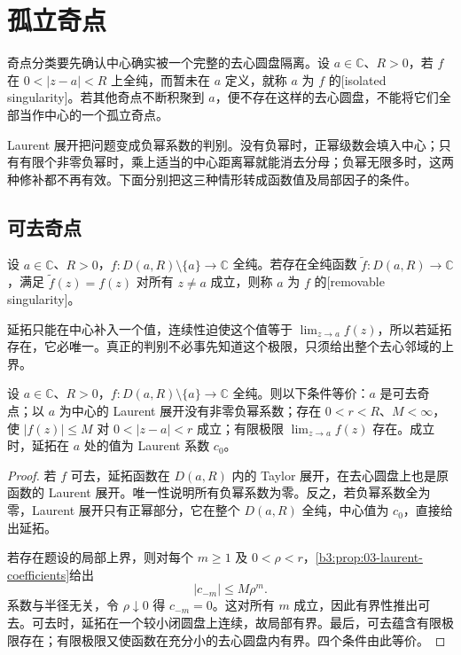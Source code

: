 \section{孤立奇点}
\label{b3:sec:0302}

奇点分类要先确认中心确实被一个完整的去心圆盘隔离。设 \(a\in\mathbb C\)、\(R>0\)，若 \(f\) 在 \(0<|z-a|<R\) 上全纯，而暂未在 \(a\) 定义，就称 \(a\) 为 \(f\) 的[isolated singularity]。若其他奇点不断积聚到 \(a\)，便不存在这样的去心圆盘，不能将它们全部当作中心的一个孤立奇点。

\ProseParagraphBreak

Laurent 展开把问题变成负幂系数的判别。没有负幂时，正幂级数会填入中心；只有有限个非零负幂时，乘上适当的中心距离幂就能消去分母；负幂无限多时，这两种修补都不再有效。下面分别把这三种情形转成函数值及局部因子的条件。

\subsection{可去奇点}
\label{b3:subsec:030201}

\begin{definition}\label{b3:def:03-removable}
设 \(a\in\mathbb C\)、\(R>0\)，\(f:D(a,R)\setminus\{a\}\to\mathbb C\) 全纯。若存在全纯函数 \(\widetilde f:D(a,R)\to\mathbb C\)，满足 \(\widetilde f(z)=f(z)\) 对所有 \(z\ne a\) 成立，则称 \(a\) 为 \(f\) 的[removable singularity]。
\end{definition}

延拓只能在中心补入一个值，连续性迫使这个值等于 \(\lim_{z\to a}f(z)\)，所以若延拓存在，它必唯一。真正的判别不必事先知道这个极限，只须给出整个去心邻域的上界。

\begin{theorem}[可去奇点判别]\label{b3:thm:03-removable}
设 \(a\in\mathbb C\)、\(R>0\)，\(f:D(a,R)\setminus\{a\}\to\mathbb C\) 全纯。则以下条件等价：\(a\) 是可去奇点；以 \(a\) 为中心的 Laurent 展开没有非零负幂系数；存在 \(0<r<R\)、\(M<\infty\)，使 \(|f(z)|\le M\) 对 \(0<|z-a|<r\) 成立；有限极限 \(\lim_{z\to a}f(z)\) 存在。成立时，延拓在 \(a\) 处的值为 Laurent 系数 \(c_0\)。
\end{theorem}
\begin{proof}
若 \(f\) 可去，延拓函数在 \(D(a,R)\) 内的 Taylor 展开，在去心圆盘上也是原函数的 Laurent 展开。唯一性说明所有负幂系数为零。反之，若负幂系数全为零，Laurent 展开只有正幂部分，它在整个 \(D(a,R)\) 全纯，中心值为 \(c_0\)，直接给出延拓。

若存在题设的局部上界，则对每个 \(m\ge1\) 及 \(0<\rho<r\)，\cref{b3:prop:03-laurent-coefficients}给出
\[
 |c_{-m}|\le M\rho^m.
\]
系数与半径无关，令 \(\rho\downarrow0\) 得 \(c_{-m}=0\)。这对所有 \(m\) 成立，因此有界性推出可去。可去时，延拓在一个较小闭圆盘上连续，故局部有界。最后，可去蕴含有限极限存在；有限极限又使函数在充分小的去心圆盘内有界。四个条件由此等价。
\end{proof}

